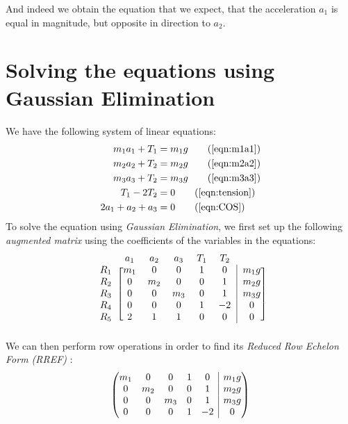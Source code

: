 \documentclass[11pt]{article}
\makeatletter
\newenvironment{amatrix}[1]{%
	\left(\begin{array}{@{}*{#1}{c} | c@{}}
	}{%
	\end{array}\right)
}						%
\makeatother
\begin{document}
\begin{appendices}
		And indeed we obtain the equation that we expect, that the acceleration $a_1$ is equal in magnitude, but opposite in direction to $a_2$. 
		
		\vfill
		
		\pagebreak
		
		\section{Solving the equations using Gaussian Elimination}
		\label{appdx:GES}
		We have the following system of linear equations:
		\begin{align*}
			m_1 a_1 + T_1 &= m_1 g \tag{\ref{eqn:m1a1}} \\
			m_2 a_2 + T_2 &= m_2 g \tag{\ref{eqn:m2a2}} \\
			m_3 a_3 + T_2 &= m_3 g \tag{\ref{eqn:m3a3}} \\
			T_1 - 2 T_2 &= 0 \tag{\ref{eqn:tension}} \\
			2a_1 + a_2 + a_3 &= 0 \tag{\ref{eqn:COS}}
		\end{align*}
		To solve the equation using \textit{Gaussian Elimination}, we first set up the following \textit{augmented matrix} using the coefficients of the variables in the equations:
		\begin{equation*}
			\begin{blockarray}{ccccccc}
			& a_1 & a_2 & a_3 & T_1 & T_2 \\
			\begin{block}{c[ccccc|c]}
			R_1 & m_1 & 0 & 0 & 1 & 0 & m_1g \\  
			R_2 & 0 & m_2 & 0 & 0 & 1 & m_2g \\
			R_3 & 0 & 0 & m_3 & 0 & 1 & m_3g \\
			R_4 & 0 & 0 & 0 & 1 & -2 & 0 \\
			R_5 & 2 & 1 & 1 & 0 & 0 & 0 \\
			\end{block}
			\end{blockarray}
		\end{equation*}
		We can then perform row operations in order to find its \textit{Reduced Row Echelon Form (RREF)} :
		\begin{align*}
			\begin{amatrix}{5}
			m_1 & 0 & 0 & 1 & 0 & m_1g \\  
			0 & m_2 & 0 & 0 & 1 & m_2g \\
			0 & 0 & m_3 & 0 & 1 & m_3g \\
			0 & 0 & 0 & 1 & -2 & 0 \\

\end{amatrix}
\end{align*}
\end{appendices}
\end{document}
